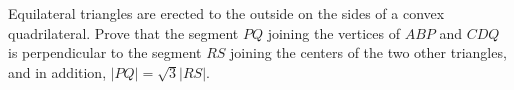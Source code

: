 Equilateral triangles are erected to the outside on the sides of a convex quadrilateral. Prove that the segment $PQ$ joining the vertices of $ABP$ and $CDQ$ is perpendicular to the segment $RS$ joining the centers of the two other triangles, and in addition, $|PQ| = \sqrt{3}|RS|$.
